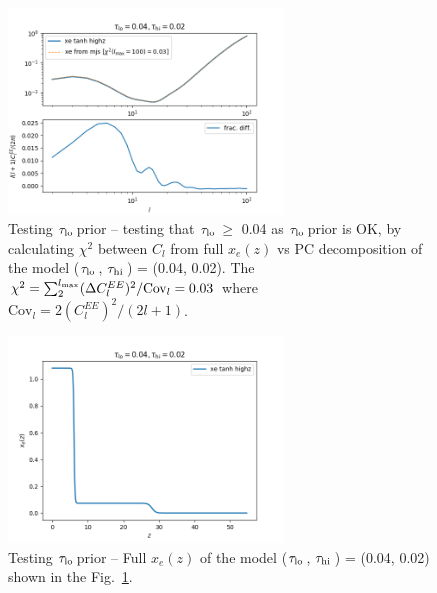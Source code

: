 \documentclass[prd,amsmath,amssymb,floatfix,superscriptaddress,nofootinbib]{revtex4-1}
\newcommand{\tauhi}{$\tau_{\rm hi}\,$}
\newcommand{\taulo}{$\tau_{\rm lo}\,$}
\begin{document}
\begin{figure}
\includegraphics[width=0.65\textwidth]{cosmomc_kde/taulo_prior_test/plot_cls_taulo_0p04_tauhi_0p02.png}
\caption{Testing \taulo prior -- testing that \taulo $\geq$ 0.04 as \taulo prior is OK, by calculating $\chi^2$ between $C_l$ from full $x_e(z)$ vs PC decomposition of the model (\taulo, \tauhi) = (0.04, 0.02). The $\chi^2 = \sum_{2}^{l_{\rm max}} (\Delta C_l^{EE})^2 / \mathrm{Cov}_l = 0.03$ where $\mathrm{Cov}_l = 2 (C_l^{EE})^2/(2l+1)$. 
} 
\label{fig:taulo_prior_test_cl}
\end{figure}

\begin{figure}
\includegraphics[width=0.65\textwidth]{cosmomc_kde/taulo_prior_test/plot_xez_taulo_0p04_tauhi_0p02.png}
\caption{Testing \taulo prior -- Full $x_e(z)$ of the model (\taulo, \tauhi) = (0.04, 0.02) shown in the Fig.~\ref{fig:taulo_prior_test_cl}. 
}
\label{fig:tau_lo_prior_test_xe}
\end{figure}
\end{document}
